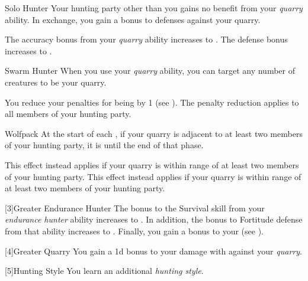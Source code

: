 {            \begin{freeability}{Solo Hunter}
                Your hunting party other than you gains no benefit from your \textit{quarry} ability.
                In exchange, you gain a  bonus to defenses against your quarry.

                \rankline
                 The accuracy bonus from your \textit{quarry} ability increases to .
                 The defense bonus increases to .
            \end{freeability}

            \begin{freeability}{Swarm Hunter}
                When you use your \textit{quarry} ability, you can target any number of creatures to be your quarry.

                \rankline
                 You reduce your penalties for being  by 1 (see ).
                 The penalty reduction applies to all members of your hunting party.
            \end{freeability}

            \begin{freeability}{Wolfpack}
                At the start of each , if your quarry is adjacent to at least two members of your hunting party, it is  until the end of that phase.

                \rankline
                 This effect instead applies if your quarry is within \rngmed range of at least two members of your hunting party.
                 This effect instead applies if your quarry is within \rnglong range of at least two members of your hunting party.
            \end{freeability}
        }

        [3]{Greater Endurance Hunter} The bonus to the Survival skill from your \textit{endurance hunter} ability increases to .
        In addition, the bonus to Fortitude defense from that ability increases to .
        Finally, you gain a  bonus to your  (see ).

        [4]{Greater Quarry} You gain a \plus1d bonus to your damage with  against your \textit{quarry}.

        [5]{Hunting Style}
        You learn an additional \textit{hunting style}.

